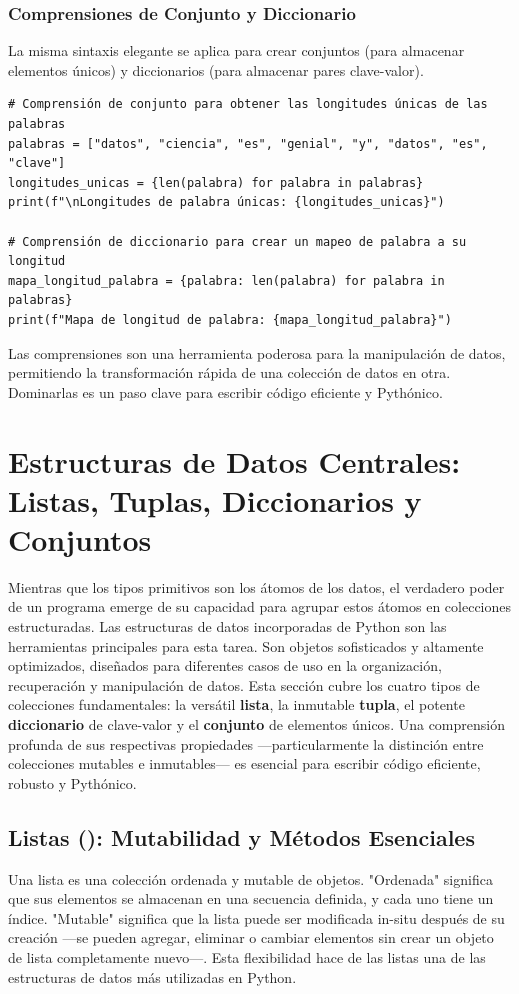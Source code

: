 \subsubsection*{Comprensiones de Conjunto y Diccionario}
La misma sintaxis elegante se aplica para crear conjuntos (para almacenar elementos únicos) y diccionarios (para almacenar pares clave-valor).

\text{ }\begin{verbatim}
# Comprensión de conjunto para obtener las longitudes únicas de las palabras
palabras = ["datos", "ciencia", "es", "genial", "y", "datos", "es", "clave"]
longitudes_unicas = {len(palabra) for palabra in palabras}
print(f"\nLongitudes de palabra únicas: {longitudes_unicas}")

# Comprensión de diccionario para crear un mapeo de palabra a su longitud
mapa_longitud_palabra = {palabra: len(palabra) for palabra in palabras}
print(f"Mapa de longitud de palabra: {mapa_longitud_palabra}")
\end{verbatim}
Las comprensiones son una herramienta poderosa para la manipulación de datos, permitiendo la transformación rápida de una colección de datos en otra. Dominarlas es un paso clave para escribir código eficiente y Pythónico.

\section{Estructuras de Datos Centrales: Listas, Tuplas, Diccionarios y Conjuntos}
\label{sec:core_data_structures}
Mientras que los tipos primitivos son los átomos de los datos, el verdadero poder de un programa emerge de su capacidad para agrupar estos átomos en colecciones estructuradas. Las estructuras de datos incorporadas de Python son las herramientas principales para esta tarea. Son objetos sofisticados y altamente optimizados, diseñados para diferentes casos de uso en la organización, recuperación y manipulación de datos. Esta sección cubre los cuatro tipos de colecciones fundamentales: la versátil \textbf{lista}, la inmutable \textbf{tupla}, el potente \textbf{diccionario} de clave-valor y el \textbf{conjunto} de elementos únicos. Una comprensión profunda de sus respectivas propiedades —particularmente la distinción entre colecciones mutables e inmutables— es esencial para escribir código eficiente, robusto y Pythónico.

\subsection{Listas (): Mutabilidad y Métodos Esenciales}
\label{subsec:lists}
Una lista es una colección ordenada y mutable de objetos. "Ordenada" significa que sus elementos se almacenan en una secuencia definida, y cada uno tiene un índice. "Mutable" significa que la lista puede ser modificada in-situ después de su creación —se pueden agregar, eliminar o cambiar elementos sin crear un objeto de lista completamente nuevo—. Esta flexibilidad hace de las listas una de las estructuras de datos más utilizadas en Python.

